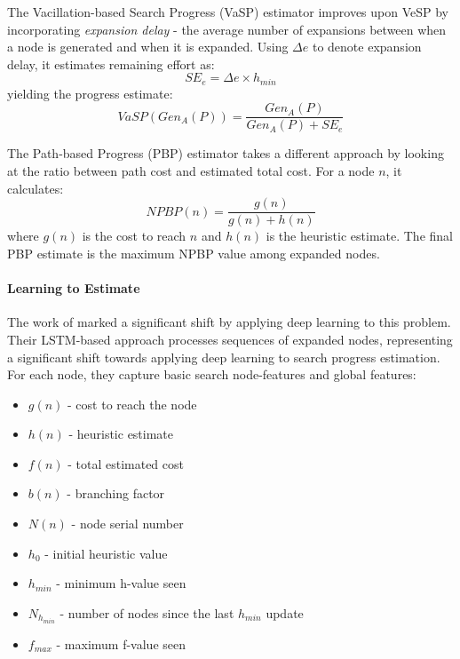 \documentclass[letterpaper]{article}
\begin{document}
The Vacillation-based Search Progress (VaSP) estimator improves upon VeSP by incorporating \emph{expansion delay} - the average number of expansions between when a node is generated and when it is expanded. Using $\Delta e$ to denote expansion delay, it estimates remaining effort as:
\begin{equation*}
    SE_e = \Delta e \times h_{min}
\end{equation*}
yielding the progress estimate:
\begin{equation}
    VaSP(Gen_A(P)) = \frac{Gen_A(P)}{Gen_A(P) + SE_e}
\end{equation}

The Path-based Progress (PBP) estimator takes a different approach by looking at the ratio between path cost and estimated total cost. For a node $n$, it calculates:
\begin{equation}
    NPBP(n) = \frac{g(n)}{g(n) + h(n)}
\end{equation}
where $g(n)$ is the cost to reach $n$ and $h(n)$ is the heuristic estimate. The final PBP estimate is the maximum NPBP value among expanded nodes.

\paragraph{Learning to Estimate}\label{para:learning-to-estimate}
The work of \citet{sudry2022learning} marked a significant shift by applying deep learning to this problem. Their LSTM-based approach processes sequences of expanded nodes, representing a significant shift towards applying deep learning to search progress estimation. For each node, they capture basic search node-features and global features:

\begin{itemize}
    \item $g(n)$ - cost to reach the node
    \item $h(n)$ - heuristic estimate
    \item $f(n)$ - total estimated cost
    \item $b(n)$ - branching factor
    \item $N(n)$ - node serial number
    \item $h_0$ - initial heuristic value
    \item $h_{min}$ - minimum h-value seen
    \item $N_{h_{min}}$ - number of nodes since the last $h_{min}$ update
    \item $f_{max}$ - maximum f-value seen
\end{itemize}
\end{document}
